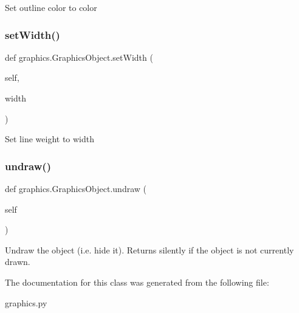 \begin{DoxyVerb}Set outline color to color\end{DoxyVerb}
 \mbox{\label{classgraphics_1_1_graphics_object_a63006871dd6242bfc7aabe9ddcbb1263}} 
\subsubsection{\texorpdfstring{set\+Width()}{setWidth()}}
{\footnotesize\ttfamily def graphics.\+Graphics\+Object.\+set\+Width (\begin{DoxyParamCaption}\item[{}]{self,  }\item[{}]{width }\end{DoxyParamCaption})}

\begin{DoxyVerb}Set line weight to width\end{DoxyVerb}
 \mbox{\label{classgraphics_1_1_graphics_object_a7dc6432aa782c84f61407362e579aaf5}} 
\subsubsection{\texorpdfstring{undraw()}{undraw()}}
{\footnotesize\ttfamily def graphics.\+Graphics\+Object.\+undraw (\begin{DoxyParamCaption}\item[{}]{self }\end{DoxyParamCaption})}

\begin{DoxyVerb}Undraw the object (i.e. hide it). Returns silently if the
object is not currently drawn.\end{DoxyVerb}
 

The documentation for this class was generated from the following file\+:\begin{DoxyCompactItemize}
\item 
graphics.\+py\end{DoxyCompactItemize}
